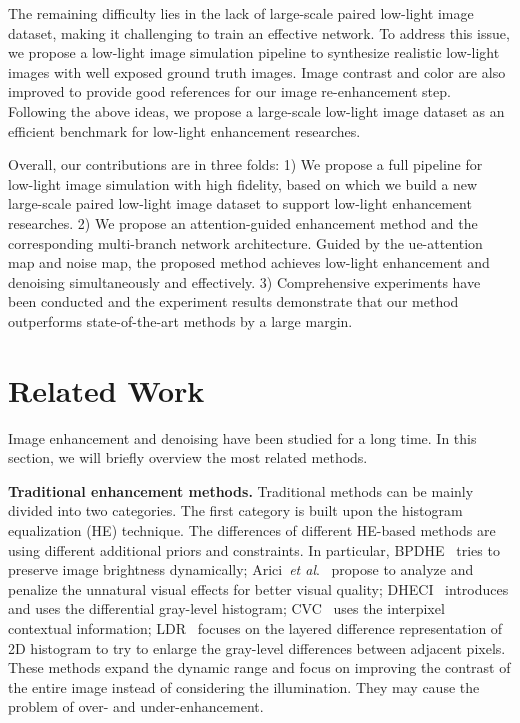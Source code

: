 The remaining difficulty lies in the lack of large-scale paired low-light image dataset, making it challenging to train an effective network. To address this issue, we propose a low-light image simulation pipeline to synthesize realistic low-light images with well exposed ground truth images. Image contrast and color are also improved to provide good references for our image re-enhancement step. Following the above ideas, we propose a large-scale low-light image dataset as an efficient benchmark for low-light enhancement researches.

Overall, our contributions are in three folds:
1) We propose a full pipeline for low-light image simulation with high fidelity, based on which we build a new large-scale paired low-light image dataset to support low-light enhancement researches.
2) We propose an attention-guided enhancement method and the corresponding multi-branch network architecture. Guided by the ue-attention map and noise map, the proposed method achieves low-light enhancement and denoising simultaneously and effectively.
3) Comprehensive experiments have been conducted and the experiment results demonstrate that our method outperforms state-of-the-art methods by a large margin.



\section{Related Work}
Image enhancement and denoising have been studied for a long time. In this section, we will briefly overview the most related methods.

{\bf Traditional enhancement methods.} Traditional methods can be mainly divided into two categories. The first category is built upon the histogram equalization (HE) technique. The differences of different HE-based methods are using different additional priors and constraints. In particular, BPDHE~\cite{ibrahim2007bpdhe} tries to preserve image brightness dynamically; Arici~\textit{et al}.~\cite{arici2009wahe} propose to analyze and penalize the unnatural visual effects for better visual quality; DHECI~\cite{nakai2013dheci} introduces and uses the differential gray-level histogram; CVC~\cite{celik2011contextual} uses the interpixel contextual information; LDR~\cite{lee2013contrast} focuses on the layered difference representation of 2D histogram to try to enlarge the gray-level differences between adjacent pixels. These methods expand the dynamic range and focus on improving the contrast of the entire image instead of considering the illumination. They may cause the problem of over- and under-enhancement.

